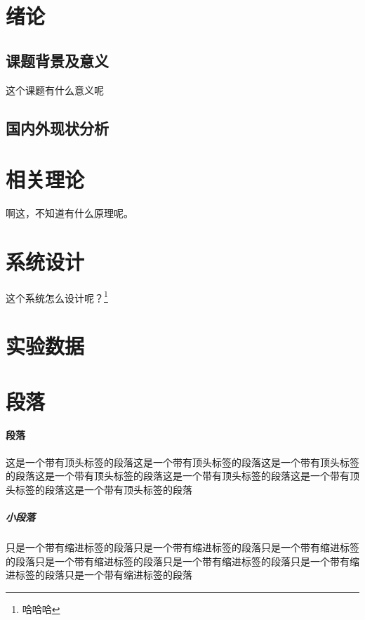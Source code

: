 \documentclass[supercite]{HustGraduPaper}
\begin{document}
\clearpage%

\section{绪论}

\subsection{课题背景及意义}

这个课题有什么意义呢

\subsection{国内外现状分析}

\section{相关理论}

啊这，不知道有什么原理呢。

\section{系统设计}

这个系统怎么设计呢？\footnote{哈哈哈}

\section{实验数据}

\section{段落}
\paragraph{段落}\label{para:para}这是一个带有顶头标签的段落这是一个带有顶头标签的段落这是一个带有顶头标签的段落这是一个带有顶头标签的段落这是一个带有顶头标签的段落这是一个带有顶头标签的段落这是一个带有顶头标签的段落
\subparagraph{小段落}\label{subpara:subpara}只是一个带有缩进标签的段落只是一个带有缩进标签的段落只是一个带有缩进标签的段落只是一个带有缩进标签的段落只是一个带有缩进标签的段落只是一个带有缩进标签的段落只是一个带有缩进标签的段落
\end{document}
